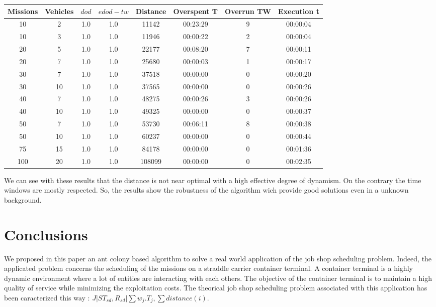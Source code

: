 \documentclass[a4paper,10pt]{article}
\begin{document}
\small
\begin{center}
  \begin{tabular}{|c|c|c|c|c|c|c|c|} 
\hline
\bf{Missions} & \bf{Vehicles} & \bf{$dod$} & \bf{$edod-tw$} & \bf{Distance} & \bf{Overspent T} & \bf{Overrun TW} &  \bf{Execution t} \\ \hline
10	 & 2 	& 1.0	& 1.0	& 11142	& 00:23:29	& 9	& 00:00:04\\
10	 & 3 	& 1.0	& 1.0	& 11946	& 00:00:22	& 2	& 00:00:04\\
20	 & 5 	& 1.0	& 1.0	& 22177	& 00:08:20	& 7	& 00:00:11\\
20	 & 7 	& 1.0	& 1.0	& 25680	& 00:00:03	& 1	& 00:00:17\\
30	 & 7 	& 1.0	& 1.0	& 37518	& 00:00:00	& 0	& 00:00:20\\
30	 & 10 	& 1.0	& 1.0	& 37565	& 00:00:00	& 0	& 00:00:26\\
40	 & 7 	& 1.0	& 1.0	& 48275	& 00:00:26	& 3	& 00:00:26\\
40	 & 10 	& 1.0	& 1.0	& 49325	& 00:00:00	& 0	& 00:00:37\\
50	 & 7 	& 1.0	& 1.0	& 53730	& 00:06:11	& 8	& 00:00:38\\
50	 & 10 	& 1.0	& 1.0	& 60237	& 00:00:00	& 0	& 00:00:44\\
75	 & 15 	& 1.0	& 1.0	& 84178	& 00:00:00	& 0	& 00:01:36\\
100	 & 20 	& 1.0	& 1.0	& 108099	& 00:00:00	& 0	& 00:02:35\\
\hline
\end{tabular}
\end{center}
\normalsize

We can see with these results that the distance is not near optimal with a high effective degree of dynamism. On the contrary the time windows are mostly respected. So, the results show the robustness of the algorithm wich provide good solutions even in a unknown background.



\section{Conclusions}

We proposed in this paper an ant colony based algorithm to solve a real world application of the job shop scheduling problem. Indeed, the applicated problem concerns the scheduling of the missions on a straddle carrier container terminal. A container terminal is a highly dynamic environment where a lot of entities are interacting with each others. The objective of the container terminal is to maintain a high quality of service while minimizing the exploitation costs. The theorical job shop scheduling problem associated with this application has been caracterized this way : ${ J|ST_{sd}, R_{sd}|\sum w_j.T_{j} , \sum distance(i)}$.
\end{document}

